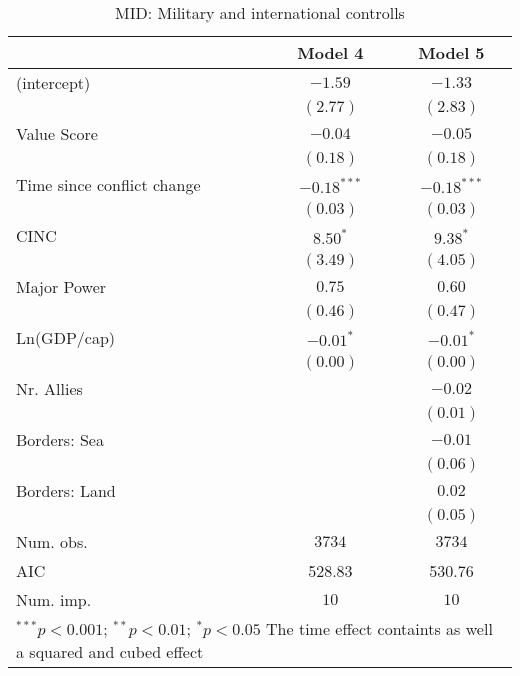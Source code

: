
\begin{table}
\begin{center}
\begin{tabular}{l c c}
\toprule
 & Model 4 & Model 5 \\
\midrule
(intercept)                & $-1.59$       & $-1.33$       \\
                           & $(2.77)$      & $(2.83)$      \\
Value Score                & $-0.04$       & $-0.05$       \\
                           & $(0.18)$      & $(0.18)$      \\
Time since conflict change & $-0.18^{***}$ & $-0.18^{***}$ \\
                           & $(0.03)$      & $(0.03)$      \\
CINC                       & $8.50^{*}$    & $9.38^{*}$    \\
                           & $(3.49)$      & $(4.05)$      \\
Major Power                & $0.75$        & $0.60$        \\
                           & $(0.46)$      & $(0.47)$      \\
Ln(GDP/cap)                & $-0.01^{*}$   & $-0.01^{*}$   \\
                           & $(0.00)$      & $(0.00)$      \\
Nr. Allies                 &               & $-0.02$       \\
                           &               & $(0.01)$      \\
Borders: Sea               &               & $-0.01$       \\
                           &               & $(0.06)$      \\
Borders: Land              &               & $0.02$        \\
                           &               & $(0.05)$      \\
\midrule
Num. obs.                  & $3734$        & $3734$        \\
AIC                        & 528.83        & 530.76        \\
Num. imp.                  & $10$          & $10$          \\
\bottomrule
\multicolumn{3}{l}{\scriptsize{$^{***}p<0.001$; $^{**}p<0.01$; $^{*}p<0.05$ 
 The time effect containts as well a squared and cubed effect}}
\end{tabular}
\caption{MID: Military and international controlls}
\label{MID_2}
\end{center}
\end{table}
